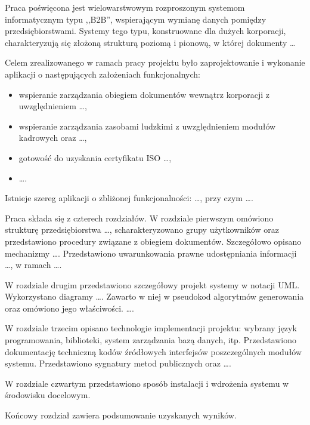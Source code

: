 {\color{dgray}
Praca poświęcona jest wielowarstwowym rozproszonym systemom informatycznym typu ,,B2B'', wspierającym wymianę danych pomiędzy przedsiębiorstwami. Systemy tego typu, konstruowane dla dużych korporacji, charakteryzują się złożoną strukturą poziomą i pionową, w której dokumenty \ldots

Celem zrealizowanego w ramach pracy projektu było zaprojektowanie i wykonanie aplikacji o następujących założeniach funkcjonalnych:
\begin{itemize}
  \item wspieranie zarządzania obiegiem dokumentów wewnątrz korporacji z uwzględnieniem \ldots,
	\item wspieranie zarządzania zasobami ludzkimi z uwzględnieniem modułów kadrowych oraz \ldots,
	\item gotowość do uzyskania certyfikatu ISO \ldots,
	\item \ldots.
\end{itemize}

Istnieje szereg aplikacji o zbliżonej funkcjonalności: \ldots, przy czym \ldots.

Praca składa się z czterech rozdziałów.
W rozdziale pierwszym omówiono strukturę przedsiębiorstwa \ldots, scharakteryzowano grupy użytkowników oraz przedstawiono procedury związane z obiegiem dokumentów. Szczegółowo opisano mechanizmy \ldots. Przedstawiono uwarunkowania prawne udostępniania informacji \ldots, w ramach \ldots.

W rozdziale drugim przedstawiono szczegółowy projekt systemy w notacji UML. Wykorzystano diagramy \ldots.
Zawarto w niej w pseudokod algorytmów generowania oraz omówiono jego właściwości. \ldots.

W rozdziale trzecim opisano technologie implementacji projektu: wybrany język programowania, biblioteki, system zarządzania bazą danych, itp.  Przedstawiono dokumentację techniczną kodów źródłowych interfejsów poszczególnych modułów systemu. Przedstawiono sygnatury metod publicznych oraz \ldots.

W rozdziale czwartym przedstawiono sposób instalacji i wdrożenia systemu w środowisku docelowym.

Końcowy rozdział zawiera podsumowanie uzyskanych wyników.
}

